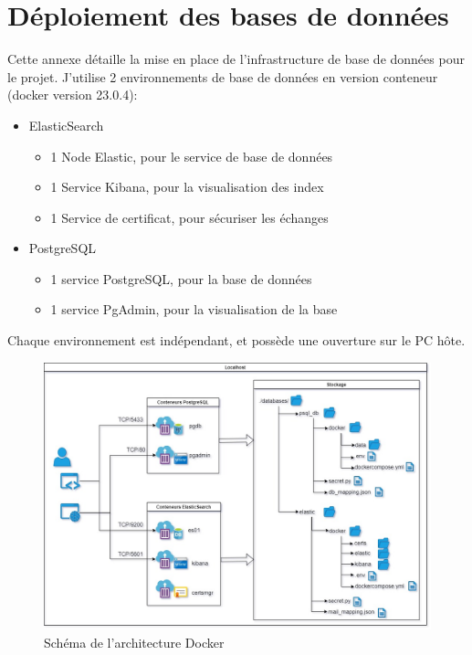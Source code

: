\documentclass[a4paper,12pt]{article}
\begin{document}
\section{Déploiement des bases de données}	
	Cette annexe détaille la mise en place de l'infrastructure de base de données pour le projet.
	J'utilise 2 environnements de base de données en version conteneur (docker version 23.0.4):
		\begin{itemize}
			\item ElasticSearch
				\begin{itemize}
					\item 1 Node Elastic, pour le service de base de données
					\item 1 Service Kibana, pour la visualisation des index
					\item 1 Service de certificat, pour sécuriser les échanges
				\end{itemize}
			\item PostgreSQL
				\begin{itemize}
					\item 1 service PostgreSQL, pour la base de données
					\item 1 service PgAdmin, pour la visualisation de la base
				\end{itemize}
		\end{itemize}
		
	Chaque environnement est indépendant, et possède une ouverture sur le PC hôte.
	
	
	\begin{figure}[H]
		\includegraphics[width=\linewidth]{img/SchemaDocker.jpg}
		\caption{Schéma de l'architecture Docker}
	\end{figure}
	
\end{document}
